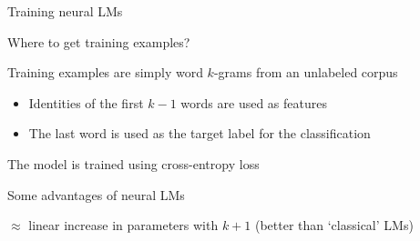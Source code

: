 \documentclass[12pt,aspectratio=169,handout]{beamer}
\begin{document}
\begin{frame}{Training neural LMs}
	
	Where to get training examples?
	
	Training examples are simply word $k$-grams from an unlabeled corpus
	\begin{itemize}
		\item Identities of the first $k - 1$ words are used as features
		\item The last word is used as the target label for the classification
	\end{itemize}
	
	The model is trained using cross-entropy loss
\end{frame}

\begin{frame}{Some advantages of neural LMs}
	
$\approx$ linear increase in parameters with $k + 1$ (better than `classical' LMs)
	
\end{frame}
\end{document}
